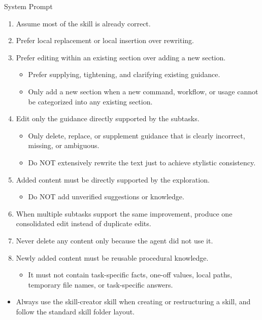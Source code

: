 \documentclass{llmxive}
\providecommand{\svpromptsubheading}[1]{\par\smallskip\noindent{\sffamily\bfseries #1}\par}
\providecommand{\svinlinecode}[1]{{\ttfamily #1}}
\begin{document}
\begin{svpromptbox}{System Prompt}
\begin{itemize}
\end{itemize}
\smallskip
\svpromptsubheading{Edit Rules}
\smallskip
\begin{enumerate}
\item Assume most of the skill is already correct.
\item Prefer local replacement or local insertion over rewriting.
\item Prefer editing within an existing section over adding a new section.
\begin{itemize}
\item Prefer supplying, tightening, and clarifying existing guidance.
\item Only add a new section when a new command, workflow, or usage cannot be categorized into any existing section.
\end{itemize}
\item Edit only the guidance directly supported by the subtasks.
\begin{itemize}
\item Only delete, replace, or supplement guidance that is clearly incorrect, missing, or ambiguous.
\item Do NOT extensively rewrite the text just to achieve stylistic consistency.
\end{itemize}
\item Added content must be directly supported by the exploration.
\begin{itemize}
\item Do NOT add unverified suggestions or knowledge.
\end{itemize}
\item When multiple subtasks support the same improvement, produce one consolidated edit instead of duplicate edits.
\item Never delete any content only because the agent did not use it.
\item Newly added content must be reusable procedural knowledge.
\begin{itemize}
\item It must not contain task-specific facts, one-off values, local paths, temporary file names, or task-specific answers.
\end{itemize}
\end{enumerate}
\smallskip
\svpromptsubheading{Create Rules}
\smallskip
\begin{itemize}
\item Always use the \svinlinecode{skill-creator} skill when creating or restructuring a skill, and follow the standard skill folder layout.

\end{itemize}
\end{svpromptbox}
\end{document}
